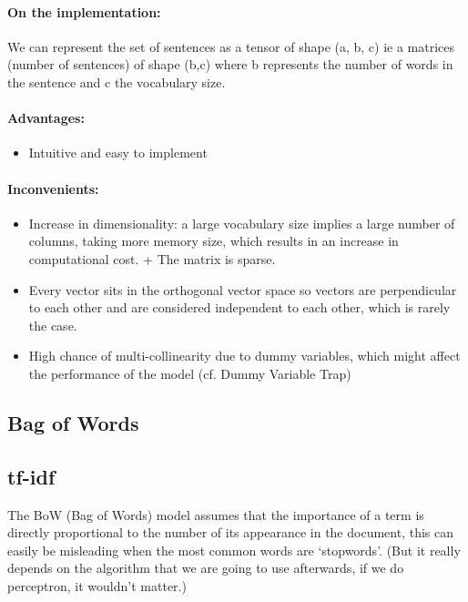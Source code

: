 \documentclass{article}
\begin{document}
\paragraph{On the implementation:}

We can represent the set of sentences as a tensor of shape (a, b, c) ie a matrices (number of sentences) of shape (b,c) where b represents the number of words in the sentence and c the vocabulary size.

\paragraph{Advantages:}

\begin{itemize}
  \item Intuitive and easy to implement
\end{itemize}

\paragraph{Inconvenients:}

\begin{itemize}
  \item Increase in dimensionality: a large vocabulary size implies a large number of columns, taking more memory size, which results in an increase in computational cost. + The matrix is sparse.
  \item Every vector sits in the orthogonal vector space so vectors are perpendicular to each other and are considered independent to each other, which is rarely the case.
  \item High chance of multi-collinearity due to dummy variables, which might affect the performance of the model (cf. Dummy Variable Trap)
\end{itemize}

\subsection{Bag of Words}

\subsection{tf-idf}

The BoW (Bag of Words) model assumes that the importance of a term is directly proportional to
the number of its appearance in the document, this can easily be misleading
when the most common words are `stopwords'. (But it really depends on
the algorithm that we are going to use afterwards, if we do perceptron, it wouldn't matter.)
\end{document}
